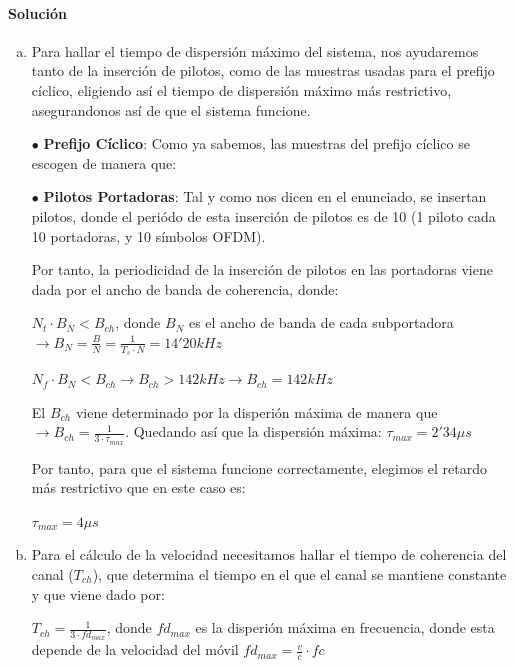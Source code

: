 \documentclass[fleqn,14pt]{article}
\begin{document}
\paragraph{Solución}
\begin{enumerate}[a)]
  \item Para hallar el tiempo de dispersión máximo del sistema, nos ayudaremos tanto de la inserción de pilotos, como de las muestras usadas para el prefijo cíclico, eligiendo así el tiempo de dispersión máximo más restrictivo, asegurandonos así de que el sistema funcione.

  $\bullet$ \textbf{Prefijo Cíclico}: Como ya sabemos, las muestras del prefijo cíclico se escogen de manera que:
  \newline


  \raggedright
  $\bullet$ \textbf{Pilotos Portadoras}: Tal y como nos dicen en el enunciado, se insertan pilotos, donde el periódo de esta inserción de pilotos es de 10 (1 piloto cada 10 portadoras, y 10 símbolos OFDM).

  Por tanto, la periodicidad de la inserción de pilotos en las portadoras viene dada por el ancho de banda de coherencia, donde:


\centering
$N_t \cdot B_N < B_{ch}$, donde $B_N$ es el ancho de banda de cada subportadora $ \rightarrow B_N = \frac{B}{N} = \frac{1}{T_s \cdot N} = 14'20 kHz$

$N_f \cdot B_N < B_{ch} \rightarrow B_{ch} > 142 kHz \rightarrow \boxed{B_{ch} = 142 kHz}$

\raggedright
El $B_{ch}$ viene determinado por la disperión máxima de manera que $\rightarrow B_{ch} = \frac{1}{3 \cdot \tau_{max}}$. Quedando así que la dispersión máxima: $\boxed{\tau_{max} = 2'34 \mu s}$

Por tanto, para que el sistema funcione correctamente, elegimos el retardo más restrictivo que en este caso es:
\begin{center}
  $\boxed{\tau_{max} = 4\mu s}$
\end{center}
  \item Para el cálculo de la velocidad necesitamos hallar el tiempo de coherencia del canal ($T_{ch}$), que determina el tiempo en el que el canal se mantiene constante y que viene dado por:
  \begin{center}
    $T_{ch}=\frac{1}{3 \cdot fd_{max}}$, donde $fd_{max}$ es la disperión máxima en frecuencia, donde esta depende de la velocidad del móvil $fd_{max} = \frac{v}{c} \cdot fc$
  \end{center}


\end{enumerate}
\end{document}
